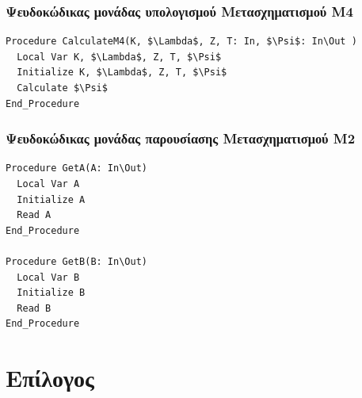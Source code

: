 \documentclass{article}
\begin{document}
\subsubsection{Ψευδοκώδικας μονάδας υπολογισμού Μετασχηματισμού Μ4}
\begin{lstlisting}[mathescape]
Procedure CalculateM4(K, $\Lambda$, Z, T: In, $\Psi$: In\Out )
  Local Var K, $\Lambda$, Z, T, $\Psi$
  Initialize K, $\Lambda$, Z, T, $\Psi$
  Calculate $\Psi$
End_Procedure
\end{lstlisting}

\subsubsection{Ψευδοκώδικας μονάδας παρουσίασης Μετασχηματισμού Μ2}
\begin{lstlisting}[mathescape]
Procedure GetA(A: In\Out)
  Local Var A
  Initialize A
  Read A
End_Procedure

Procedure GetB(B: In\Out)
  Local Var B
  Initialize B
  Read B
End_Procedure
\end{lstlisting}

\newpage
\section{Επίλογος}
\end{document}
